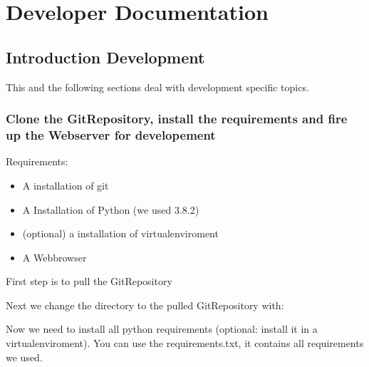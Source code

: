 \documentclass[letterpaper,10pt,english]{sphinxmanual}
\begin{document}
\chapter{Developer Documentation}
\label{\detokenize{masterDeveloperDoc:developer-documentation}}\label{\detokenize{masterDeveloperDoc::doc}}

\section{Introduction Development}
\label{\detokenize{masterDeveloperDoc:introduction-development}}
This and the following sections deal with development specific topics.


\subsection{Clone the Git\sphinxhyphen{}Repository, install the requirements and fire up the Webserver for developement}
\label{\detokenize{masterDeveloperDoc:clone-the-git-repository-install-the-requirements-and-fire-up-the-webserver-for-developement}}
Requirements:
\begin{itemize}
\item {} 
A installation of git

\item {} 
A Installation of Python (we used 3.8.2)

\item {} 
(optional) a installation of virtualenviroment

\item {} 
A Webbrowser

\end{itemize}

First step is to pull the Git\sphinxhyphen{}Repository
\begin{quote}

\end{quote}

Next we change the directory to the pulled Git\sphinxhyphen{}Repository with:
\begin{quote}

\end{quote}

Now we need to install all python requirements (optional: install it in a virtualenviroment).
You can use the requirements.txt, it contains all requirements we used.
\begin{quote}

\end{quote}
\end{document}
